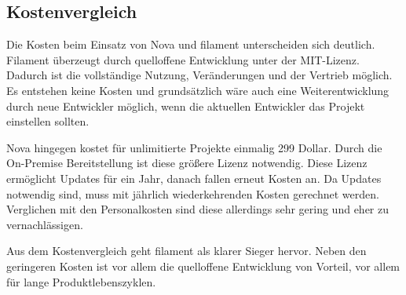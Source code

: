 \subsection{Kostenvergleich}
Die Kosten beim Einsatz von Nova und filament unterscheiden sich deutlich.
Filament überzeugt durch quelloffene Entwicklung unter der MIT-Lizenz.
Dadurch ist die vollständige Nutzung, Veränderungen und der Vertrieb möglich.
Es entstehen keine Kosten und grundsätzlich wäre auch eine Weiterentwicklung durch neue Entwickler möglich, wenn die aktuellen Entwickler das Projekt einstellen sollten.

Nova hingegen kostet für unlimitierte Projekte einmalig 299 Dollar.
Durch die On-Premise Bereitstellung ist diese größere Lizenz notwendig.
Diese Lizenz ermöglicht Updates für ein Jahr, danach fallen erneut Kosten an.
Da Updates notwendig sind, muss mit jährlich wiederkehrenden Kosten gerechnet werden.
Verglichen mit den Personalkosten sind diese allerdings sehr gering und eher zu vernachlässigen.

Aus dem Kostenvergleich geht filament als klarer Sieger hervor.
Neben den geringeren Kosten ist vor allem die quelloffene Entwicklung von Vorteil, vor allem für lange Produktlebenszyklen.
